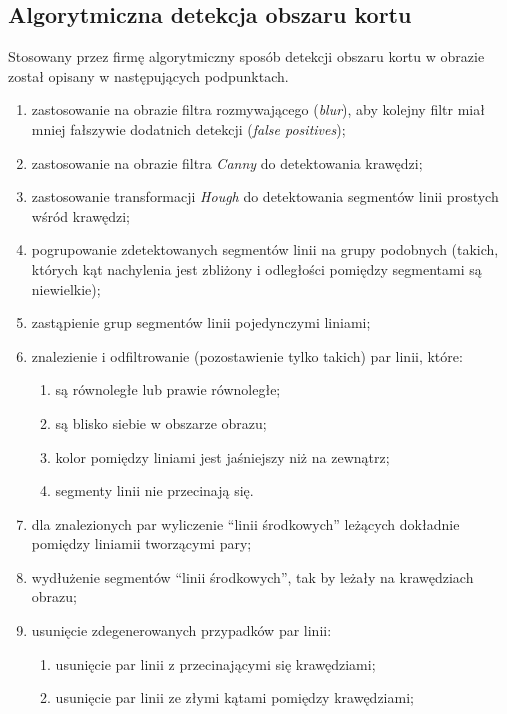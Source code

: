 \subsection{Algorytmiczna detekcja obszaru kortu}
\label{sec:aglorytmiczna_detekcja}

Stosowany przez firmę \blue{} algorytmiczny sposób detekcji obszaru kortu w obrazie został opisany w następujących podpunktach.

\begin{enumerate}
  \item zastosowanie na obrazie filtra rozmywającego (\textit{blur}), aby kolejny filtr miał mniej fałszywie dodatnich detekcji (\textit{false positives});
  \item zastosowanie na obrazie filtra \textit{Canny} do detektowania krawędzi;
  \item zastosowanie transformacji \textit{Hough} do detektowania segmentów linii prostych wśród krawędzi;
  \item pogrupowanie zdetektowanych segmentów linii na grupy podobnych (takich, których kąt nachylenia jest zbliżony i odległości pomiędzy segmentami są niewielkie);
  \item zastąpienie grup segmentów linii pojedynczymi liniami;
  \item znalezienie i odfiltrowanie (pozostawienie tylko takich) par linii, które:
        \begin{enumerate}
          \item są równoległe lub prawie równoległe;
          \item są blisko siebie w obszarze obrazu;
          \item kolor pomiędzy liniami jest jaśniejszy niż na zewnątrz;
          \item segmenty linii nie przecinają się.
        \end{enumerate}
  \item dla znalezionych par wyliczenie  ``linii środkowych'' leżących dokładnie pomiędzy liniamii tworzącymi pary;
  \item wydłużenie segmentów ``linii środkowych'', tak by leżały na krawędziach obrazu;
  \item usunięcie zdegenerowanych przypadków par linii:
        \begin{enumerate}
          \item usunięcie par linii z przecinającymi się krawędziami;
          \item usunięcie par linii ze złymi kątami pomiędzy krawędziami;

\end{enumerate}
\end{enumerate}
